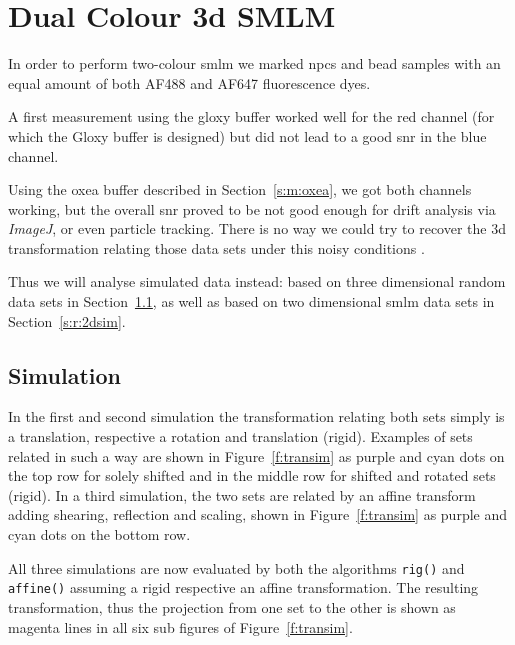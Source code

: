 \documentclass[11pt, a4paper, oneside, twocolumn]{report}
\renewcommand{\tt}{\texttt}
\renewcommand{\t}{\todo}
\newcommand{\e}{\emph}
\newcommand{\x}[1]{#1\index{#1}}
\begin{document}
\clearpage\section{Dual Colour 3d SMLM}\label{s:r:dcsim}

In order to perform two-colour \gls{smlm} we marked \gls{npc}s and
bead samples with an equal amount of both AF488 and AF647 fluorescence
dyes.

A first measurement using the \gls{gloxy} buffer worked well for the
red channel (for which the Gloxy buffer is designed) but did not lead
to a good \gls{snr} in the blue channel.

Using the \gls{oxea} buffer described in Section~\ref{s:m:oxea}, we
got both channels working, but the overall \gls{snr} proved to be not
good enough for drift analysis via \e{ImageJ}, or even \x{particle
  tracking}. There is no way we could try to recover the 3d
transformation relating those data sets under this noisy conditions
\t{image}.

Thus we will analyse simulated data instead: based on three
dimensional random data sets in Section~\ref{s:r:3dsim}, as well as
based on two dimensional \gls{smlm} data sets in
Section~\ref{s:r:2dsim}.


\subsection{Simulation}\label{s:r:3dsim}

In the first and second simulation the transformation relating both
sets simply is a translation, respective a rotation and translation
(rigid). Examples of sets related in such a way are shown in
Figure~\ref{f:transim} as purple and cyan dots on the top row for
solely shifted and in the middle row for shifted and rotated sets
(rigid). In a third simulation, the two sets are related by an affine
transform adding shearing, reflection and scaling, shown in
Figure~\ref{f:transim} as purple and cyan dots on the bottom row.

All three simulations are now evaluated by both the algorithms
\tt{rig()} and \tt{affine()} assuming a rigid respective an affine
transformation. The resulting transformation, thus the projection from
one set to the other is shown as magenta lines in all six sub figures
of Figure~\ref{f:transim}.
\end{document}
